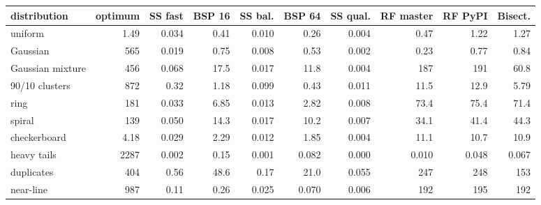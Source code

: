 \begin{tabular}{lrrrrrrrrr}
\toprule
distribution & optimum & SS fast & BSP 16 & SS bal. & BSP 64 & SS qual. & RF master & RF PyPI & Bisect. \\
\midrule
uniform & 1.49 & 0.034 & 0.41 & 0.010 & 0.26 & 0.004 & 0.47 & 1.22 & 1.27 \\
Gaussian & 565 & 0.019 & 0.75 & 0.008 & 0.53 & 0.002 & 0.23 & 0.77 & 0.84 \\
Gaussian mixture & 456 & 0.068 & 17.5 & 0.017 & 11.8 & 0.004 & 187 & 191 & 60.8 \\
90/10 clusters & 872 & 0.32 & 1.18 & 0.099 & 0.43 & 0.011 & 11.5 & 12.9 & 5.79 \\
ring & 181 & 0.033 & 6.85 & 0.013 & 2.82 & 0.008 & 73.4 & 75.4 & 71.4 \\
spiral & 139 & 0.050 & 14.3 & 0.017 & 10.2 & 0.007 & 34.1 & 41.4 & 44.3 \\
checkerboard & 4.18 & 0.029 & 2.29 & 0.012 & 1.85 & 0.004 & 11.1 & 10.7 & 10.9 \\
heavy tails & 2287 & 0.002 & 0.15 & 0.001 & 0.082 & 0.000 & 0.010 & 0.048 & 0.067 \\
duplicates & 404 & 0.56 & 48.6 & 0.17 & 21.0 & 0.055 & 247 & 248 & 153 \\
near-line & 987 & 0.11 & 0.26 & 0.025 & 0.070 & 0.006 & 192 & 195 & 192 \\
\bottomrule
\end{tabular}
